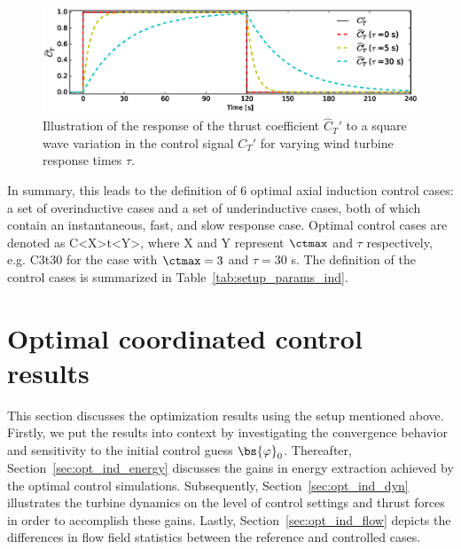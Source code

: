 \begin{figure}[t]
	\centering
	\includegraphics[width=\textwidth]{chapters/optimal_control_problem/figure3.eps}    
	\caption{Illustration of the response of the thrust coefficient $\widehat{C}_T'$ to a square wave variation in the control signal $C_T'$ for varying wind turbine response times $\tau$. \label{fig:cthat_ind}}
\end{figure}
 
In summary, this leads to the definition of 6 optimal axial induction control cases: a set of overinductive cases and a set of underinductive cases, both of which contain an instantaneous, fast, and slow response case. Optimal control cases are denoted as C<X>t<Y>, where X and Y represent $\ctmax$ and $\tau$ respectively, e.g. C3t30 for the case with $\ctmax=3$ and $\tau=30$ s. The definition of the control cases is summarized in Table~\ref{tab:setup_params_ind}.



\section{Optimal coordinated control results}\label{sec:opt_ind_results}
This section discusses the optimization results using the setup mentioned above. Firstly, we put the results into context by investigating the convergence behavior and sensitivity to the initial control guess $\bs{\varphi}_0$. Thereafter, Section~\ref{sec:opt_ind_energy} discusses the gains in energy extraction achieved by the optimal control simulations. Subsequently, Section~\ref{sec:opt_ind_dyn} illustrates the turbine dynamics on the level of control settings and thrust forces in order to accomplish these gains. Lastly, Section~\ref{sec:opt_ind_flow} depicts the differences in flow field statistics between the reference and controlled cases.

